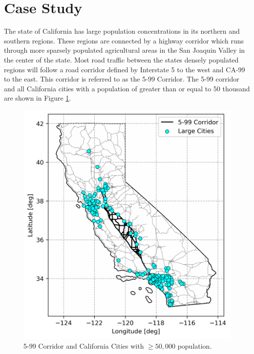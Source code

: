 \section{Case Study}


The state of California has large population concentrations in its northern and southern regions. These regions are connected by a highway corridor which runs through more sparsely populated agricultural areas in the San Joaquin Valley in the center of the state. Most road traffic between the states densely populated regions will follow a road corridor defined by Interstate 5 to the west and CA-99 to the east. This corridor is referred to as the 5-99 Corridor. The 5-99 corridor and all California cities with a population of greater than or equal to 50 thousand are shown in Figure \ref{fig:places_corridor}.

\begin{figure}[H]
	\centering
	\includegraphics[width = \figurewidth]{./figures/places_corridor.png}
	\caption{5-99 Corridor and California Cities with $\geq 50,000$ population.}
	\label{fig:places_corridor}
\end{figure}

